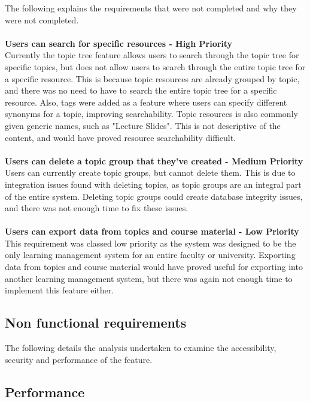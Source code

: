 The following explains the requirements that were not completed and why they were not completed.\\
\\
\textbf{Users can search for specific resources - High Priority} \\
Currently the topic tree feature allows users to search through the topic tree for specific topics, but does not allow users to search through the entire topic tree for a specific resource. This is because topic resources are already grouped by topic, and there was no need to have to search the entire topic tree for a specific resource. Also, tags were added as a feature where users can specify different synonyms for a topic, improving searchability. Topic resources is also commonly given generic names, such as "Lecture Slides". This is not descriptive of the content, and would have proved resource searchability difficult. \\
\\
\textbf{Users can delete a topic group that they've created - Medium Priority}\\
Users can currently create topic groups, but cannot delete them. This is due to integration issues found with deleting topics, as topic groups are an integral part of the entire system. Deleting topic groups could create database integrity issues, and there was not enough time to fix these issues.\\
\\
\textbf{Users can export data from topics and course material - Low Priority} \\
This requirement was classed low priority as the system was designed to be the only learning management system for an entire faculty or university. Exporting data from topics and course material would have proved useful for exporting into another learning management system, but there was again not enough time to implement this feature either.\\

\subsection {Non functional requirements}

The following details the analysis undertaken to examine the accessibility, security and performance of the feature. 

\subsection {Performance}

